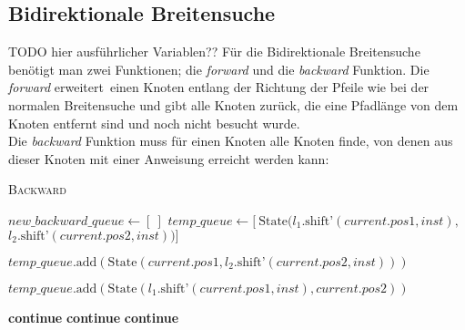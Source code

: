 \documentclass[a4paper,10pt,ngerman]{scrartcl}
\begin{document}
    \subsection{Bidirektionale Breitensuche}
    TODO hier ausführlicher Variablen??
    Für die Bidirektionale Breitensuche benötigt man zwei Funktionen; die \textit{forward} und die \textit{backward} Funktion. Die \textit{forward} \glqq erweitert\grqq~einen Knoten entlang der Richtung der Pfeile wie bei der normalen Breitensuche und gibt alle Knoten zurück, die eine Pfadlänge von dem Knoten entfernt sind und noch nicht besucht wurde. \\
    Die \textit{backward} Funktion muss für einen Knoten alle Knoten finde, von denen aus dieser Knoten mit einer Anweisung erreicht werden kann:
    \begin{algorithm}[H]
        \label{backward}
        \caption{\textsc{Backward}}
        \begin{algorithmic}[1]
                \State $\textit{new\_backward\_queue} \gets [\ ]$
                    \State $\textit{temp\_queue} \gets [\ \text{State}(l_1.\text{shift'}(\textit{current.pos1}, \textit{inst}),$
                    \State \hspace{5em}$l_2.\text{shift'}(\textit{current.pos2}, \textit{inst})) ]$

                        \State $\textit{temp\_queue}.\text{add}(\text{State}(\textit{current.pos1}, l_2.\text{shift'}(\textit{current.pos2}, \textit{inst})))$
                    \EndIf

                        \State $\textit{temp\_queue}.\text{add}(\text{State}(l_1.\text{shift'}(\textit{current.pos1}, \textit{inst}), \textit{current.pos2}))$
                    \EndIf

                            \State \textbf{continue}
                        \EndIf
                            \State \textbf{continue}
                        \EndIf
                            \State \textbf{continue}
                        \EndIf


\end{algorithmic}
\end{algorithm}
\end{document}

